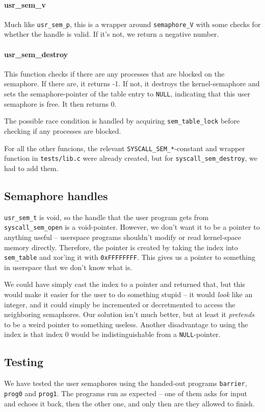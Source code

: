 \documentclass{article}
\begin{document}
\paragraph{usr\_sem\_v}
Much like \texttt{usr\_sem\_p}, this is a wrapper around \texttt{semaphore\_V} with some checks for whether the handle is valid. If it's not, we return a negative number.

\paragraph{usr\_sem\_destroy}
This function checks if there are any processes that are blocked on the semaphore. If there are, it returns -1. If not, it destroys the kernel-semaphore and sets the semaphore-pointer of the table entry to \texttt{NULL}, indicating that this user semaphore is free. It then returns 0.

The possible race condition is handled by acquiring \texttt{sem\_table\_lock} before checking if any processes are blocked.

For all the other funcions, the relevant \texttt{SYSCALL\_SEM\_*}-constant and wrapper function in \texttt{tests/lib.c} were already created, but for \texttt{syscall\_sem\_destroy}, we had to add them.

\subsection{Semaphore handles}
\texttt{usr\_sem\_t} is void, so the handle that the user program gets from \texttt{syscall\_sem\_open} is a void-pointer. However, we don't want it to be a pointer to anything useful -- userspace programs shouldn't modify or read kernel-space memory directly. Therefore, the pointer is created by taking the index into \texttt{sem\_table} and xor'ing it with \texttt{0xFFFFFFFF}. This gives us a pointer to something in userspace that we don't know what is.

We could have simply cast the index to a pointer and returned that, but this would make it easier for the user to do something stupid -- it would \emph{look} like an integer, and it could simply be incremented or decretmented to access the neighboring semaphores. Our solution isn't much better, but at least it \emph{pretends} to be a weird pointer to something useless. Another disadvantage to using the index is that index 0 would be indistinguishable from a \texttt{NULL}-pointer.

\subsection{Testing}
We have tested the user semaphores using the handed-out programs \texttt{barrier}, \texttt{prog0} and \texttt{prog1}. The programs run as expected -- one of them asks for input and echoes it back, then the other one, and only then are they allowed to finish.
\end{document}
